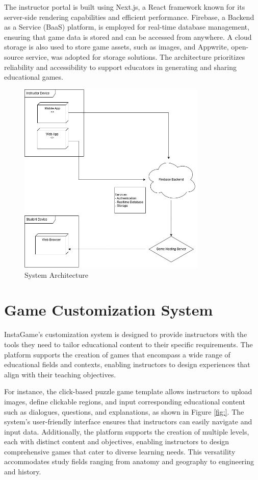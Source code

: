 The instructor portal is built using Next.js, a React framework known for its server-side rendering capabilities and efficient performance. Firebase, a Backend as a Service (BaaS) platform, is employed for real-time database management, ensuring that game data is stored and can be accessed from anywhere. A cloud storage is also used to store game assets, such as images, and Appwrite, open-source service, was adopted for storage solutions. The architecture prioritizes reliability and accessibility to support educators in generating and sharing educational games.

\begin{figure}
	\centering
	\includegraphics[width=0.8\textwidth]{figures/Deployment_UML.jpg}
	\caption{System Architecture}
	\label{fig:architecture}
\end{figure}

\section{Game Customization System}

InstaGame’s customization system is designed to provide instructors with the tools they need to tailor educational content to their specific requirements. The platform supports the creation of games that encompass a wide range of educational fields and contexts, enabling instructors to design experiences that align with their teaching objectives.

For instance, the click-based puzzle game template allows instructors to upload images, define clickable regions, and input corresponding educational content such as dialogues, questions, and explanations, as shown in Figure \ref{fig:}. The system’s user-friendly interface ensures that instructors can easily navigate and input data. Additionally, the platform supports the creation of multiple levels, each with distinct content and objectives, enabling instructors to design comprehensive games that cater to diverse learning needs. This versatility accommodates study fields ranging from anatomy and geography to engineering and history.

